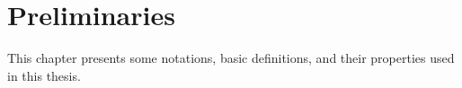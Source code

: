 \documentclass[../main]{subfiles}
\begin{document}
\chapter{Preliminaries} \label{sec:preliminaries}
This chapter presents some notations, basic definitions, and their properties used in this thesis.
















\end{document}
